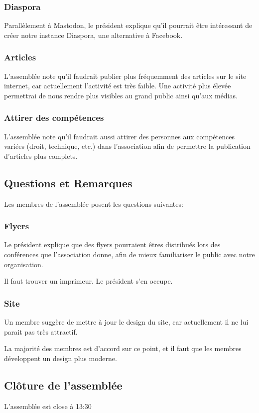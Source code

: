 \documentclass[12pt,twoside]{report}
\begin{document}
\subsubsection*{Diaspora}

Parallèlement à Mastodon, le président explique qu'il pourrait être intéressant de créer notre instance Diaspora, une alternative à Facebook.


\subsubsection*{Articles}

L'assemblée note qu'il faudrait publier plus fréquemment des articles sur le site internet, car actuellement l'activité est très faible. Une activité plus élevée permettrai de nous rendre plus visibles au grand public  ainsi qu'aux médias.

\subsubsection*{Attirer des compétences}
L'assemblée note qu'il faudrait aussi attirer des personnes aux compétences variées (droit, technique, etc.) dans l'association afin de permettre la publication d'articles plus complets. 

\pagebreak

\subsection*{Questions et Remarques}

Les membres de l'assemblée posent les questions suivantes:

\subsubsection*{Flyers}
Le président explique que des flyers pourraient êtres distribués lors des conférences que l'association donne, afin de mieux familiariser le public avec notre organisation.

Il faut trouver un imprimeur. Le président s'en occupe.

\subsubsection*{Site}

Un membre suggère de mettre à jour le design du site, car actuellement il ne lui parait pas très attractif. 

La majorité des membres est d'accord sur ce point, et il faut que les membres développent un design plus moderne.


\subsection*{Clôture de l'assemblée}

L'assemblée est close à 13:30
\end{document}
